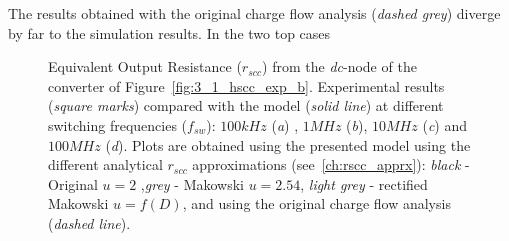 The results obtained with the original charge flow analysis (\emph{dashed grey}) diverge by far to the simulation results. In the two top cases


\begin{figure}[!h]
\centering
    \begin{subfigure}{\textwidth}
        \parbox[c]{.03\linewidth}{\subcaption{}\label{fig:exp_rscc_dc_node_100kHz}}
        \hspace{.02\linewidth}
        \parbox[c]{.95\linewidth}{
        \centering
        }
    \end{subfigure}

    \begin{subfigure}{\textwidth}
        \parbox[c]{.03\linewidth}{\subcaption{}\label{fig:exp_rscc_dc_node_1MHz}}
        \hspace{.02\linewidth}
        \parbox[c]{.95\linewidth}{
        \centering
        }
    \end{subfigure}

    \begin{subfigure}{\textwidth}
        \parbox[c]{.03\linewidth}{\subcaption{}\label{fig:exp_rscc_dc_node_10MHz}}
        \hspace{.02\linewidth}
        \parbox[c]{.95\linewidth}{
        \centering
        }
    \end{subfigure}

    \begin{subfigure}{\textwidth}
        \parbox[c]{.03\linewidth}{\subcaption{}\label{fig:exp_rscc_dc_node_100MHz}}
        \hspace{.02\linewidth}
        \parbox[c]{.95\linewidth}{
        \centering
        }
    \end{subfigure}

\caption{Equivalent Output Resistance ($r_{scc}$) from the \emph{dc}-node of the converter of Figure~\ref{fig:3_1_hscc_exp_b}. Experimental results (\emph{square marks}) compared with the model (\emph{solid line}) at different switching frequencies ($f_{sw}$): $100kHz$ (\emph{a}) , $1MHz$ (\emph{b}), $10MHz$ (\emph{c}) and $100MHz$ (\emph{d}). Plots are obtained using the presented model using  the different analytical $r_{scc}$ approximations (see~\ref{ch:rscc_apprx}): \emph{black} - Original $u=2$ ,\emph{grey} - Makowski  $u=2.54$, \emph{light grey} - rectified Makowski $u=f(D)$, and using the original charge flow analysis (\emph{dashed line}).}
\label{fig:exp_rscc_dc_node_dx}
\end{figure}

